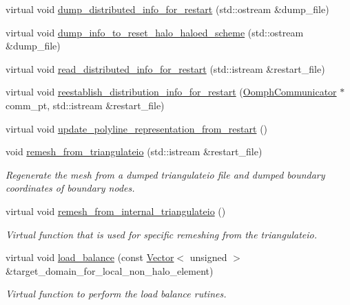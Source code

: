 \begin{DoxyCompactItemize}
virtual void \hyperlink{classoomph_1_1TriangleMeshBase_ad8e275d5f2528d9958964438086be8f4}{dump\+\_\+distributed\+\_\+info\+\_\+for\+\_\+restart} (std\+::ostream \&dump\+\_\+file)
\item 
virtual void \hyperlink{classoomph_1_1TriangleMeshBase_a4254c01acfaf43213d96491902334148}{dump\+\_\+info\+\_\+to\+\_\+reset\+\_\+halo\+\_\+haloed\+\_\+scheme} (std\+::ostream \&dump\+\_\+file)
\item 
virtual void \hyperlink{classoomph_1_1TriangleMeshBase_a56273b6d7b690d37f07632c7028adcf8}{read\+\_\+distributed\+\_\+info\+\_\+for\+\_\+restart} (std\+::istream \&restart\+\_\+file)
\item 
virtual void \hyperlink{classoomph_1_1TriangleMeshBase_ae37b5239c84808e3e66aa0eac4396a2c}{reestablish\+\_\+distribution\+\_\+info\+\_\+for\+\_\+restart} (\hyperlink{classoomph_1_1OomphCommunicator}{Oomph\+Communicator} $\ast$comm\+\_\+pt, std\+::istream \&restart\+\_\+file)
\item 
virtual void \hyperlink{classoomph_1_1TriangleMeshBase_ae822f78ce56d1ff9a3c06d7ec8bc2563}{update\+\_\+polyline\+\_\+representation\+\_\+from\+\_\+restart} ()
\item 
void \hyperlink{classoomph_1_1TriangleMeshBase_a8e8d7354b213cba989b661f0b748d8b5}{remesh\+\_\+from\+\_\+triangulateio} (std\+::istream \&restart\+\_\+file)
\begin{DoxyCompactList}\small\item\em Regenerate the mesh from a dumped triangulateio file and dumped boundary coordinates of boundary nodes. \end{DoxyCompactList}\item 
virtual void \hyperlink{classoomph_1_1TriangleMeshBase_a2e7f54673e522b9be0543f0256afd04b}{remesh\+\_\+from\+\_\+internal\+\_\+triangulateio} ()
\begin{DoxyCompactList}\small\item\em Virtual function that is used for specific remeshing from the triangulateio. \end{DoxyCompactList}\item 
virtual void \hyperlink{classoomph_1_1TriangleMeshBase_ad6e2c45db7c67e5a6fd063f0ea9bbfe7}{load\+\_\+balance} (const \hyperlink{classoomph_1_1Vector}{Vector}$<$ unsigned $>$ \&target\+\_\+domain\+\_\+for\+\_\+local\+\_\+non\+\_\+halo\+\_\+element)
\begin{DoxyCompactList}\small\item\em Virtual function to perform the load balance rutines. \end{DoxyCompactList}\item 

\end{DoxyCompactItemize}
